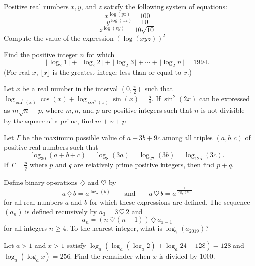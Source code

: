 \documentclass[mast]{lucky}
\begin{document}
\begin{prob}{4}
Positive real numbers $x, y$, and $z$ satisfy the following system of equations:
$$x^{\log(yz)} = 100$$
$$y^{\log(xz)} = 10$$
$$z^{\log(xy)} = 10\sqrt{10}$$
Compute the value of the expression $(\log(xyz))^2$
\end{prob}

\begin{prob}[AIME 1994/4]{4}
Find the positive integer $n$ for which \[ \lfloor \log_2{1}\rfloor+\lfloor\log_2{2}\rfloor+\lfloor\log_2{3}\rfloor+\cdots+\lfloor\log_2{n}\rfloor=1994.  \]  (For real $x$, $\lfloor x\rfloor$ is the greatest integer less than or equal to $x$.)
\end{prob}

\begin{prob}{6}
Let $x$ be a real number in the interval $(0,\frac{\pi}{2})$ such that
$\log_{\sin^2(x)} \cos(x) + \log_{\cos^2(x)} \sin(x) = \frac{5}{4}$.
If $\sin^2(2x)$ can be expressed as $m\sqrt{n} -p$, where $m, n$, and $p$ are positive integers such
that $n$ is not divisible by the square of a prime, find $m + n + p$.
\end{prob}

\begin{prob}{6}
Let $\Gamma$ be the maximum possible value of $a+3b+9c$ among all triples $(a,b,c)$ of positive real numbers such that
\[ \log_{30}(a+b+c) = \log_{8}(3a) = \log_{27} (3b) = \log_{125} (3c) .\]If $\Gamma = \frac{p}{q}$ where $p$ and $q$ are relatively prime positive integers, then find $p+q$.
\end{prob}

\begin{prob}[AMC 12A 2019/23]{9}
Define binary operations $\diamondsuit$ and $\heartsuit$ by$$a \, \diamondsuit \, b = a^{\log_{7}(b)} \qquad \text{and} \qquad a  \, \heartsuit \, b = a^{\frac{1}{\log_{7}(b)}}$$for all real numbers $a$ and $b$ for which these expressions are defined. The sequence $(a_n)$ is defined recursively by $a_3 = 3\, \heartsuit\, 2$ and$$a_n = (n\, \heartsuit\, (n-1)) \,\diamondsuit\, a_{n-1}$$for all integers $n \geq 4$. To the nearest integer, what is $\log_{7}(a_{2019})$?
\end{prob}

\begin{prob}[AIME I 2017/14]{13}
Let $a > 1$ and $x > 1$ satisfy $\log_a(\log_a(\log_a 2) + \log_a 24 - 128) = 128$ and $\log_a(\log_a x) = 256$. Find the remainder when $x$ is divided by $1000$.
\end{prob}
\end{document}
